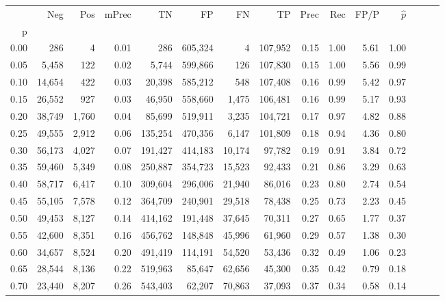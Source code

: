 \begin{tabular}{rrrrrrrrrrrrrrr}
\toprule
{} &     Neg &    Pos & mPrec &       TN &       FP &       FN &       TP &  Prec &   Rec &  FP/P & $\hat{p}$ \\
p    &         &        &       &          &          &          &          &       &       &       &           \\
\midrule
0.00 &     286 &      4 &  0.01 &      286 &  605,324 &        4 &  107,952 &  0.15 &  1.00 &  5.61 &      1.00 \\
0.05 &   5,458 &    122 &  0.02 &    5,744 &  599,866 &      126 &  107,830 &  0.15 &  1.00 &  5.56 &      0.99 \\
0.10 &  14,654 &    422 &  0.03 &   20,398 &  585,212 &      548 &  107,408 &  0.16 &  0.99 &  5.42 &      0.97 \\
0.15 &  26,552 &    927 &  0.03 &   46,950 &  558,660 &    1,475 &  106,481 &  0.16 &  0.99 &  5.17 &      0.93 \\
0.20 &  38,749 &  1,760 &  0.04 &   85,699 &  519,911 &    3,235 &  104,721 &  0.17 &  0.97 &  4.82 &      0.88 \\
0.25 &  49,555 &  2,912 &  0.06 &  135,254 &  470,356 &    6,147 &  101,809 &  0.18 &  0.94 &  4.36 &      0.80 \\
0.30 &  56,173 &  4,027 &  0.07 &  191,427 &  414,183 &   10,174 &   97,782 &  0.19 &  0.91 &  3.84 &      0.72 \\
0.35 &  59,460 &  5,349 &  0.08 &  250,887 &  354,723 &   15,523 &   92,433 &  0.21 &  0.86 &  3.29 &      0.63 \\
0.40 &  58,717 &  6,417 &  0.10 &  309,604 &  296,006 &   21,940 &   86,016 &  0.23 &  0.80 &  2.74 &      0.54 \\
0.45 &  55,105 &  7,578 &  0.12 &  364,709 &  240,901 &   29,518 &   78,438 &  0.25 &  0.73 &  2.23 &      0.45 \\
0.50 &  49,453 &  8,127 &  0.14 &  414,162 &  191,448 &   37,645 &   70,311 &  0.27 &  0.65 &  1.77 &      0.37 \\
0.55 &  42,600 &  8,351 &  0.16 &  456,762 &  148,848 &   45,996 &   61,960 &  0.29 &  0.57 &  1.38 &      0.30 \\
0.60 &  34,657 &  8,524 &  0.20 &  491,419 &  114,191 &   54,520 &   53,436 &  0.32 &  0.49 &  1.06 &      0.23 \\
0.65 &  28,544 &  8,136 &  0.22 &  519,963 &   85,647 &   62,656 &   45,300 &  0.35 &  0.42 &  0.79 &      0.18 \\
0.70 &  23,440 &  8,207 &  0.26 &  543,403 &   62,207 &   70,863 &   37,093 &  0.37 &  0.34 &  0.58 &      0.14 \\

\end{tabular}
